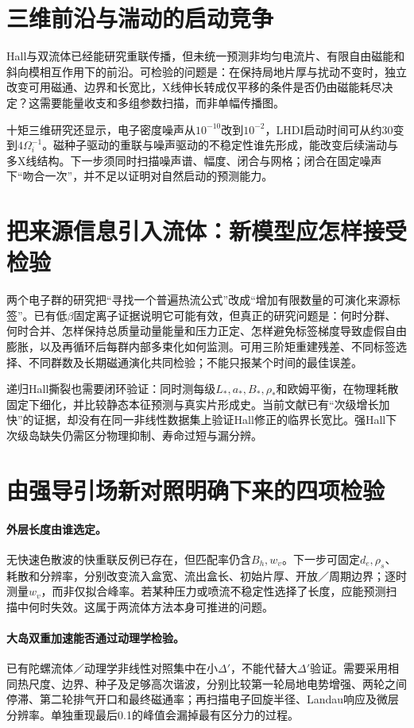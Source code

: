 \section{三维前沿与湍动的启动竞争}
Hall与双流体已经能研究重联传播，但未统一预测非均匀电流片、有限自由磁能和斜向模相互作用下的前沿。可检验的问题是：在保持局地片厚与扰动不变时，独立改变可用磁通、边界和长宽比，X线伸长转成仅平移的条件是否仍由磁能耗尽决定？这需要能量收支和多组参数扫描，而非单幅传播图。\citep{L275}

十矩三维研究还显示，电子密度噪声从$10^{-10}$改到$10^{-2}$，LHDI启动时间可从约$30$变到$4\Omega_i^{-1}$。磁种子驱动的重联与噪声驱动的不稳定性谁先形成，能改变后续湍动与多X线结构。下一步须同时扫描噪声谱、幅度、闭合与网格；闭合在固定噪声下“吻合一次”，并不足以证明对自然启动的预测能力。\citep{E552}

\section{把来源信息引入流体：新模型应怎样接受检验}
两个电子群的研究把“寻找一个普遍热流公式”改成“增加有限数量的可演化来源标签”。已有低$\beta$固定离子证据说明它可能有效，但真正的研究问题是：何时分群、何时合并、怎样保持总质量动量能量和压力正定、怎样避免标签梯度导致虚假自由膨胀，以及再循环后每群内部多束化如何监测。可用三阶矩重建残差、不同标签选择、不同群数及长期磁通演化共同检验；不能只报某个时间的最佳误差。\citep{F635}

递归Hall撕裂也需要闭环验证：同时测每级$L_*,a_*,B_*,\rho_*$和欧姆平衡，在物理耗散固定下细化，并比较静态本征预测与真实片形成史。当前文献已有“次级增长加快”的证据，却没有在同一非线性数据集上验证Hall修正的临界长宽比。强Hall下次级岛缺失仍需区分物理抑制、寿命过短与漏分辨。\citep{L236,L262}

\section{由强导引场新对照明确下来的四项检验}
\paragraph{外层长度由谁选定。}无快速色散波的快重联反例已存在，但匹配率仍含$B_h,w_v$。下一步可固定$d_e,\rho_s$、耗散和分辨率，分别改变流入盒宽、流出盒长、初始片厚、开放／周期边界；逐时测量$w_v$，而非仅拟合峰率。若某种压力或喷流不稳定性选择了长度，应能预测扫描中何时失效。这属于两流体方法本身可推进的问题。\citep{L216,L217}

\paragraph{大岛双重加速能否通过动理学检验。}已有陀螺流体／动理学非线性对照集中在小$\Delta'$，不能代替大$\Delta'$验证。需要采用相同热尺度、边界、种子及足够高次谐波，分别比较第一轮局地电势增强、两轮之间停滞、第二轮排气开口和最终磁通率；再扫描电子回旋半径、Landau响应及微层分辨率。单独重现最后0.1的峰值会漏掉最有区分力的过程。\citep{F672,E475}

